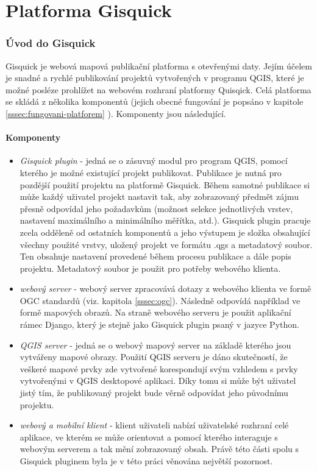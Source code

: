 \newpage
\part{Platforma Gisquick}
\newpage

\section{Úvod do Gisquick}

Gisquick je webová mapová publikační platforma s otevřenými daty. Jejím
účelem je snadné a rychlé publikování projektů vytvořených v programu
QGIS, které je možné posléze prohlížet na webovém rozhraní platformy
Quisqick.
Celá platforma se skládá z několika komponentů (jejich obecné fungování
je popsáno v kapitole \ref{sssec:fungovani-platforem} ). Komponenty jsou
následující.

\subsection{Komponenty}
\label{sssec:gisquick-komponenty}


\begin{itemize}
\item\textit{Gisquick plugin} - jedná se o zásuvný modul pro
program QGIS, pomocí kterého je možné existující projekt
publikovat. Publikace je nutná pro pozdější použití projektu
na platformě Gisquick. Během samotné publikace si může každý
uživatel projekt nastavit tak, aby zobrazovaný předmět zájmu
přesně odpovídal jeho požadavkům (možnost selekce jednotlivých
vrstev, nastavení maximálního a minimálního měřítka,
atd.). Gisquick plugin pracuje zcela odděleně od ostatních
komponentů a jeho výstupem je složka obsahující všechny použité
vrstvy, uložený projekt ve formátu .qgs a metadatový soubor. Ten
obsahuje nastavení provedené během procesu publikace a dále popis
projektu. Metadatový soubor je použit pro potřeby webového klienta.
\item\textit{webový server} - webový server zpracovává
dotazy z webového klienta ve formě OGC standardů (viz. kapitola
\ref{sssec:ogc}). Následně odpovídá například ve formě mapových
obrazů. Na straně webového serveru je použit aplikační rámec Django,
který je stejně jako Gisquick plugin psaný v jazyce Python.
\item\textit{QGIS server} - jedná se o webový mapový server
na základě kterého jsou vytvářeny mapové obrazy. Použití
QGIS serveru je dáno skutečností, že veškeré mapové prvky
zde vytvořené korespondují svým vzhledem s prvky vytvořenými
v QGIS desktopové aplikaci. Díky tomu si může být uživatel
jistý tím, že publikovaný projekt bude věrně odpovídat jeho
původnímu projektu.
\item\textit{webový a mobilní klient} - klient uživateli nabízí
uživatelské rozhraní celé aplikace, ve kterém se může
orientovat a pomocí kterého interaguje s webovým serverem a tak
mění zobrazovaný obsah. Právě této části spolu s Gisquick
pluginem byla je v této práci věnována největší pozornost.
\end{itemize}

